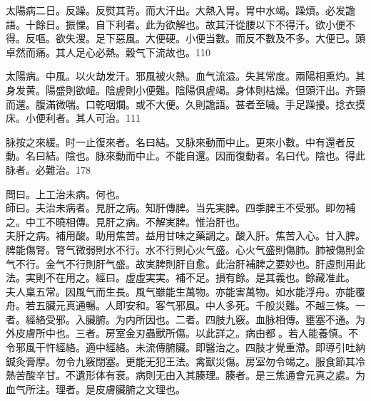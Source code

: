 太陽病二日。反躁。反熨其背。而大汗出。大熱入胃。胃中水竭。躁煩。必发譫語。十餘日。振慄。自下利者。此为欲解也。故其汗從腰以下不得汗。欲小便不得。反嘔。欲失溲。足下惡風。大便硬。小便当數。而反不數及不多。大便已。頭卓然而痛。其人足心必熱。穀气下流故也。110

太陽病。中風。以火劫发汗。邪風被火熱。血气流溢。失其常度。兩陽相熏灼。其身发黄。陽盛則欲衄。陰虗{\khaaitp 則}小便難。陰陽俱虗竭。身体則枯燥。但頭汗出。齐頸而還。腹滿微喘。口乾咽爛。或不大便。久則譫語。甚者至噦。手足躁擾。捻衣摸床。小便利者。其人可治。111

脉按之來緩。时一止復來者。名曰結。又脉來動而中止。更來小數。中有還者反動。名曰結。陰也。脉來動而中止。不能自還。因而復動者。名曰代。陰也。得此脉者。必難治。178

問曰。上工治未病。何也。\\
師曰。夫治未病者。見肝之病。知肝傳脾。当先実脾。四季脾王不受邪。即勿補之。中工不曉相傳。見肝之病。不解実脾。惟治肝也。\\
夫肝之病。補用酸。助用焦苦。益用甘味之藥調之。酸入肝。焦苦入心。甘入脾。脾能傷腎。腎气微弱則水不行。水不行則心火气盛。心火气盛則傷肺。肺被傷則金气不行。金气不行則肝气盛。故実脾則肝自愈。此治肝補脾之要妙也。肝虛則用此法。実則不在用之。經曰。虛虛実実。補不足。損有餘。是其義也。餘藏准此。\\
夫人稟五常。因風气而生長。風气雖能生萬物。亦能害萬物。如水能浮舟。亦能覆舟。若五臟元真通暢。人即安和。客气邪風。中人多死。千般災難。不越三條。一者。經絡受邪。入臟腑。为内所因也。二者。四肢九竅。血脉相傳。壅塞不通。为外皮膚所中也。三者。房室金刃蟲獸所傷。以此詳之。病由都{\sungtpii 𥁞}。若人能養慎。不令邪風干忤經絡。適中經絡。未流傳腑臟。即醫治之。四肢才覺重滯。即導引吐納鍼灸膏摩。勿令九竅閉塞。更能无犯王法。禽獸災傷。房室勿令竭之。服食節其冷熱苦酸辛甘。不遺形体有衰。病則无由入其腠理。腠者。是三焦通會元真之處。为血气所注。理者。是皮膚臟腑之文理也。



%
